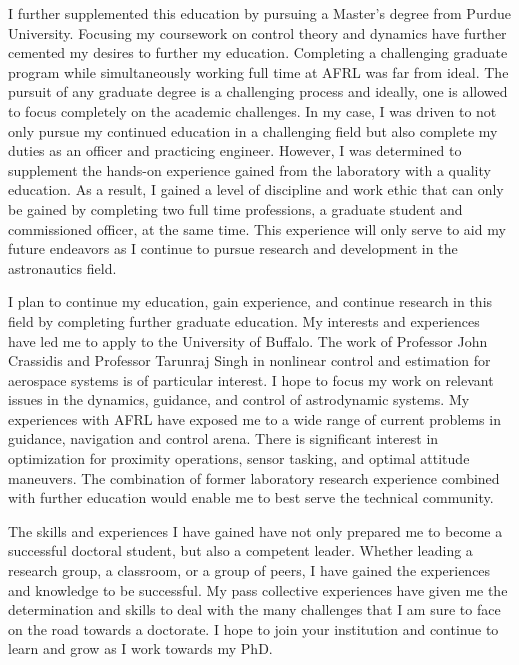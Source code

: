 \documentclass[12pt, oneside]{article}   	%
\begin{document}
I further supplemented this education by pursuing a Master's degree from Purdue University.
Focusing my coursework on control theory and dynamics have further cemented my desires to further my education.
Completing a challenging graduate program while simultaneously working full time at AFRL was far from ideal.
The pursuit of any graduate degree is a challenging process and ideally, one is allowed to focus completely on the academic challenges.
In my case, I was driven to not only pursue my continued education in a challenging field but also complete my duties as an officer and practicing engineer. 
However, I was determined to supplement the hands-on experience gained from the laboratory with a quality education.
As a result, I gained a level of discipline and work ethic that can only be gained by completing two full time professions, a graduate student and commissioned officer, at the same time.
This experience will only serve to aid my future endeavors as I continue to pursue research and development in the astronautics field.



I plan to continue my education, gain experience, and continue research in this field by completing further graduate education.   
My interests and experiences have led me to apply to the University of Buffalo. 
The work of Professor John Crassidis and Professor Tarunraj Singh in nonlinear control and estimation for aerospace systems is of particular interest. 
I hope to focus my work on relevant issues in the dynamics, guidance, and control of astrodynamic systems.  
My experiences with AFRL have exposed me to a wide range of current problems in guidance, navigation and control arena. 
There is significant interest in optimization for proximity operations, sensor tasking, and optimal attitude maneuvers.  
The combination of former laboratory research experience combined with further education would enable me to best serve the technical community.


The skills and experiences I have gained have not only prepared me to become a successful doctoral student, but also a competent leader.
Whether leading a research group, a classroom, or a group of peers, I have gained the experiences and knowledge to be successful. 
My pass collective experiences have given me the determination and skills to deal with the many challenges that I am sure to face on the road towards a doctorate. 
I hope to join your institution and continue to learn and grow as I work towards my PhD.


\end{document}
